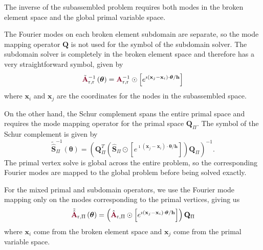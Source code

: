 The inverse of the subassembled problem requires both modes in the broken element space and the global primal variable space.

The Fourier modes on each broken element subdomain are separate, so the mode mapping operator $\mathbf{Q}$ is not used for the symbol of the subdomain solver.
The subdomain solver is completely in the broken element space and therefore has a very straightforward symbol, given by
\begin{equation}
\tilde{\color{burgundy}\mathbf{A}}_{\text{r}, \text{r}}^{-1} \left( \boldsymbol{\theta} \right) = {\color{burgundy}\mathbf{A}}_{\text{r}, \text{r}}^{-1} \odot \left[ e^{\imath \left( \mathbf{x}_j - \mathbf{x}_i \right) \cdot \boldsymbol{\theta} / \mathbf{h}} \right]
\end{equation}
where $\mathbf{x}_i$ and $\mathbf{x}_j$ are the coordinates for the nodes in the subassembled space.

On the other hand, the Schur complement spans the entire primal space and requires the mode mapping operator for the primal space $\mathbf{Q}_{\Pi}$.
The symbol of the Schur complement is given by
\begin{equation}
\tilde{\hat{\mathbf{S}}}_{\Pi}^{-1} \left( \boldsymbol{\theta} \right) = \left( \mathbf{Q}_{\Pi}^T \left( \hat{\mathbf{S}}_{\Pi} \odot \left[ e^{\imath \left( \mathbf{x}_j - \mathbf{x}_i \right) \cdot \boldsymbol{\theta} / \mathbf{h}} \right] \right) \mathbf{Q}_{\Pi} \right)^{-1}.
\end{equation}
The primal vertex solve is global across the entire problem, so the corresponding Fourier modes are mapped to the global problem before being solved exactly.

For the mixed primal and subdomain operators, we use the Fourier mode mapping only on the modes corresponding to the primal vertices, giving us
\begin{equation}
\tilde{\hat{\color{burgundy}\mathbf{A}}}\color{black}_{\text{r}, \Pi} \left( \boldsymbol{\theta} \right) = \left( \hat{\color{burgundy}\mathbf{A}}_{\text{r}, \Pi} \odot \left[ e^{\imath \left( \mathbf{x}_j - \mathbf{x}_i \right) \cdot \boldsymbol{\theta} / \mathbf{h}} \right] \right) \mathbf{Q}_{\Pi}
\end{equation}
where $\mathbf{x}_i$ come from the broken element space and $\mathbf{x}_j$ come from the primal variable space.

